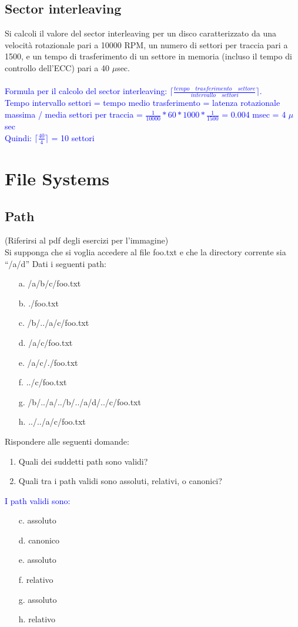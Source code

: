 \documentclass[12pt]{article}
\begin{document}
\subsection{Sector interleaving}
Si calcoli il valore del sector interleaving per un disco caratterizzato da una velocità rotazionale pari
a 10000 RPM, un numero di settori per traccia pari a 1500, e un tempo di trasferimento di un settore
in memoria (incluso il tempo di controllo dell'ECC) pari a 40 $\mu$sec.\\\\
\textcolor{blue}{Formula per il calcolo del sector interleaving: $\lceil \frac{tempo \quad trasferimento \quad settore}{intervallo \quad settori} \rceil$.\\
Tempo intervallo settori = tempo medio trasferimento = latenza rotazionale massima / media settori per traccia = $\frac{1}{10000} * 60 * 1000 * \frac{1}{1500}$ = 0.004 msec = 4 $\mu$sec\\
Quindi: $\lceil \frac{40}{4} \rceil$ = 10 settori}
\section{File Systems}
\subsection{Path}
(Riferirsi al pdf degli esercizi per l'immagine)\\
Si supponga che si voglia accedere al file foo.txt e che la directory corrente sia “/a/d”
Dati i seguenti path:
\begin{itemize}
    \item [a.] /a/b/c/foo.txt
    \item [b.] ./foo.txt
    \item [c.] /b/../a/c/foo.txt
    \item [d.] /a/c/foo.txt
    \item [e.] /a/c/./foo.txt
    \item [f.] ../c/foo.txt
    \item [g.] /b/../a/../b/../a/d/../c/foo.txt
    \item [h.] ../../a/c/foo.txt
\end{itemize}
Rispondere alle seguenti domande:
\begin{enumerate}
    \item Quali dei suddetti path sono validi?
    \item Quali tra i path validi sono assoluti, relativi, o canonici?\\
\end{enumerate}
\textcolor{blue}{I path validi sono:}
\begin{itemize}
    \color{blue}
    \item [c.] assoluto
    \item [d.] canonico
    \item [e.] assoluto
    \item [f.] relativo
    \item [g.] assoluto
    \item [h.] relativo
\end{itemize}
\end{document}
